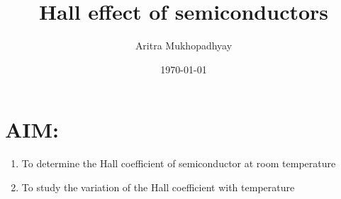 \documentclass[reprint,amsmath,amssymb,aps]{revtex4-2}
\begin{document}
    \title{Hall effect of semiconductors}

    \author{Aritra Mukhopadhyay}
    \date{\today}

    
    \maketitle

    \section{AIM:}
        \begin{enumerate}
            \item To determine the Hall coefficient of semiconductor at room temperature
            \item To study the variation of the Hall coefficient with temperature 
        \end{enumerate}

    
    
    
    

    
    \nocite{*}
\end{document}
